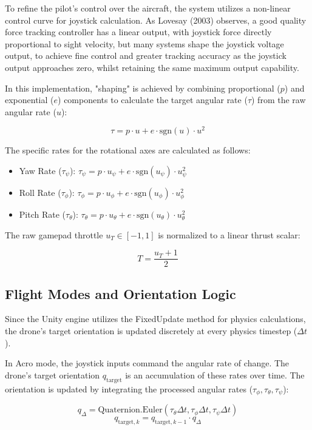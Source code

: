 To refine the pilot's control over the aircraft, the system utilizes a non-linear control curve for joystick calculation. As Lovesay (2003) observes, a good quality force tracking controller has a linear output, with joystick force directly proportional to sight velocity, but many systems shape the joystick voltage output, to achieve fine control and greater tracking accuracy as the joystick output approaches zero, whilst retaining the same maximum output capability.

In this implementation, "shaping" is achieved by combining proportional ($p$) and exponential ($e$) components to calculate the target angular rate ($\tau$) from the raw angular rate ($u$):

$$\tau = p \cdot u + e \cdot \text{sgn}(u) \cdot u^{2}$$

The specific rates for the rotational axes are calculated as follows:

\begin{itemize}
    \item Yaw Rate ($\tau_\psi$): $\tau_\psi = p \cdot u_\psi + e \cdot \text{sgn}(u_\psi) \cdot u_\psi^{2}$
    \item Roll Rate ($\tau_\phi$): $\tau_\phi = p \cdot u_\phi + e \cdot \text{sgn}(u_\phi) \cdot u_\phi^{2}$
    \item Pitch Rate ($\tau_\theta$): $\tau_\theta = p \cdot u_\theta + e \cdot \text{sgn}(u_\theta) \cdot u_\theta^{2}$
\end{itemize}

The raw gamepad throttle $u_T \in [-1, 1]$ is normalized to a linear thrust scalar:

$$T = \frac{u_T + 1}{2}$$

\subsection{Flight Modes and Orientation Logic}

Since the Unity engine utilizes the FixedUpdate method for physics calculations, the drone's target orientation is updated discretely at every physics timestep ($\Delta t$).

In Acro mode, the joystick inputs command the angular rate of change. The drone's target orientation $q_{\text{target}}$ is an accumulation of these rates over time. The orientation is updated by integrating the processed angular rates ($\tau_\phi, \tau_\theta, \tau_\psi$):

$$q_{\Delta} = \text{Quaternion.Euler}(\tau_\theta \Delta t, \tau_\phi \Delta t, \tau_\psi \Delta t)$$
$$q_{\text{target}, k} = q_{\text{target}, k-1} \cdot q_{\Delta}$$

